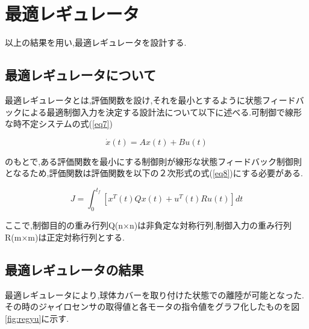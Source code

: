 \documentclass[12pt,oneside]{sotsuken_paper}
\begin{document}
\section{最適レギュレータ}
以上の結果を用い,最適レギュレータを設計する.

\subsection{最適レギュレータについて}

最適レギュレータとは,評価関数を設け,それを最小とするように状態フィードバックによる最適制御入力を決定する設計法について以下に述べる.可制御で線形な時不定システムの式(\ref{eq7})

\begin{equation}
	\dot{x}(t) = Ax(t)+Bu(t)
	\label{eq7}
\end{equation}

のもとで,ある評価関数を最小にする制御則が線形な状態フィードバック制御則となるため,評価関数は評価関数を以下の２次形式の式(\ref{eq8})にする必要がある.

\begin{equation}
	J = \int^{t_f}_0 [x^T(t)Qx(t)+u^T(t)Ru(t)]dt
	\label{eq8}
\end{equation}

ここで,制御目的の重み行列Q(n×n)は非負定な対称行列,制御入力の重み行列R(m×m)は正定対称行列とする.\cite{regyuu}

\subsection{最適レギュレータの結果}
最適レギュレータにより,球体カバーを取り付けた状態での離陸が可能となった.
その時のジャイロセンサの取得値と各モータの指令値をグラフ化したものを図\ref{fig:regyu}に示す.
\end{document}
